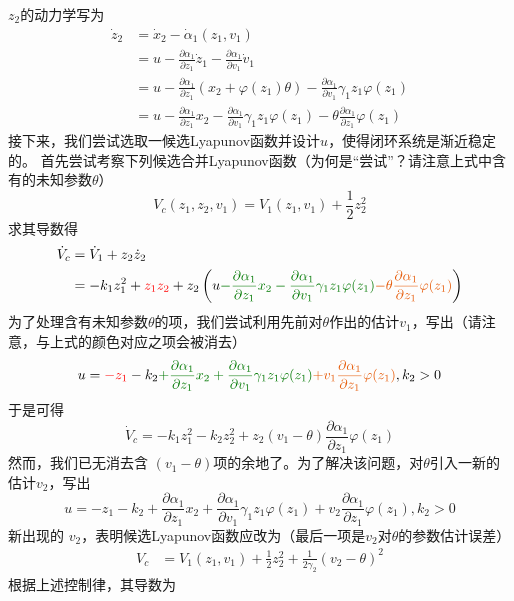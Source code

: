 $z_2$的动力学写为
  \begin{align*}
  \dot{z}_2 & = \dot{x}_2 - \dot{\alpha}_1 (z_1, v_1)\\
  & = u - \frac{\partial \alpha_1}{\partial z_1} \dot{z}_1 - \frac{\partial
  \alpha_1}{\partial v_1} \dot{v}_1\\
  & = u - \frac{\partial \alpha_1}{\partial z_1} (x_2 + \varphi (z_1)
  \theta) - \frac{\partial \alpha_1}{\partial v_1} \gamma_1 z_1 \varphi
  (z_1)\\
  & = u - \frac{\partial \alpha_1}{\partial z_1} x_2 - \frac{\partial
  \alpha_1}{\partial v_1} \gamma_1 z_1 \varphi (z_1) - \theta \frac{\partial
  \alpha_1}{\partial z_1} \varphi (z_1)
\end{align*}
接下来，我们尝试选取一候选Lyapunov函数并设计$u$，使得闭环系统是渐近稳定的。
首先尝试考察下列候选合并Lyapunov函数（为何是“尝试”？请注意上式中含有的未知参数$\theta$）
\[ V_c (z_1, z_2, v_1) = V_1 (z_1, v_1) + \frac{1}{2} z^2_2 \]
求其导数得
\begin{align*}
  \dot{V}_c & = \dot{V}_1 + z_2 \dot{z}_2\\
  & = - k_1 z^2_1 + \textcolor{red}{z_1 z_2} + z_2 \left( u \textcolor{structurecolor}{- \frac{\partial
  \alpha_1}{\partial z_1} x_2 - \frac{\partial \alpha_1}{\partial v_1}
  \gamma_1 z_1 \varphi (z_1)} \textcolor{second}{- \theta \frac{\partial \alpha_1}{\partial z_1}  \varphi (z_1)} \right)
\end{align*}
为了处理含有未知参数$\theta$的项，我们尝试利用先前对$\theta$作出的估计$v_1$，写出（请注意，与上式的颜色对应之项会被消去）
\[ u = \textcolor{red}{- z_1} - k_2 \textcolor{structurecolor}{+ \frac{\partial \alpha_1}{\partial z_1} x_2 +
   \frac{\partial \alpha_1}{\partial v_1} \gamma_1 z_1 \varphi (z_1)} \textcolor{second}{+ v_1
   \frac{\partial \alpha_1}{\partial z_1} \varphi (z_1)}, k_2 > 0 \]
于是可得
\[ \dot{V}_c = - k_1 z^2_1 - k_2 z^2_2 + z_2 (v_1 - \theta) \frac{\partial
   \alpha_1}{\partial z_1} \varphi (z_1) \]
然而，我们已无消去含 $(v_1 - \theta)$项的余地了。为了解决该问题，对$\theta$引入一新的估计$v_2$，写出
\[ u = - z_1 - k_2 + \frac{\partial \alpha_1}{\partial z_1} x_2 +
   \frac{\partial \alpha_1}{\partial v_1} \gamma_1 z_1 \varphi (z_1) + v_2
   \frac{\partial \alpha_1}{\partial z_1} \varphi (z_1), k_2 > 0 \]
新出现的 $v_2$，表明候选Lyapunov函数应改为（最后一项是$v_2$对$\theta$的参数估计误差）
\begin{align*}
  V_c & = V_1 (z_1, v_1) + \frac{1}{2} z^2_2 + \frac{1}{2 \gamma_2} (v_2 -
  \theta)^2
\end{align*}
根据上述控制律，其导数为
